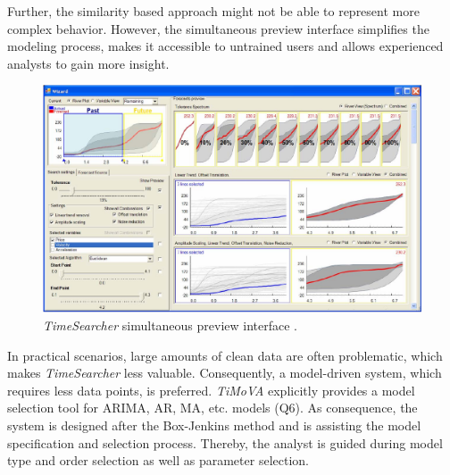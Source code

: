 \documentclass[electronic]{vgtc}             %
\begin{document}
Further, the similarity based approach might not be able to represent more complex behavior.
However, the simultaneous preview interface simplifies the modeling process, makes it accessible to untrained users and allows experienced analysts to gain more insight.
\begin{figure}[!b]
	\centering
	\includegraphics[width=\columnwidth]{TimeSearcher}
	\caption{\textit{TimeSearcher} simultaneous preview interface \cite{buono:2007}.
	}
	\label{fig:timesearcher}
\end{figure}
In practical scenarios, large amounts of clean data are often problematic, which makes \textit{TimeSearcher} \cite{buono:2007} less valuable.
Consequently, a model-driven system, which requires less data points, is preferred.
\textit{TiMoVA} \cite{boegl:2013} explicitly provides a model selection tool for  ARIMA, AR, MA, etc. models (Q6).
As consequence, the system is designed after the Box-Jenkins method and is assisting the model specification and selection process.
Thereby, the analyst is guided during model type and order selection as well as parameter selection.
\end{document}

